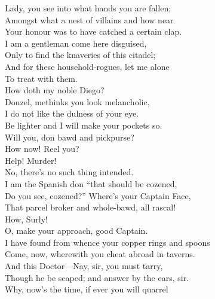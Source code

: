 \documentclass[a4paper,oneside,12pt]{memoir}
\begin{document}
\begin{drama*}
\surlyspeaks Lady, you see into what hands you are fallen;\\
Amongst what a nest of villains and how near\\
Your honour was to have catched a certain clap.\\
I am a gentleman come here disguised,\\
Only to find the knaveries of this citadel;\\
And for these household-rogues, let me alone\\
To treat with them.\\
\subtlespeaks {} How doth my noble Diego?\\
Donzel, methinks you look melancholic,\\
I do not like the dulness of your eye.\\
Be lighter and I will make your pockets so.\\
\surlyspeaks Will you, don bawd and pickpurse?\\
 How now! Reel you?\\
\subtlespeaks Help! Murder!\\
\surlyspeaks {} No, there's no such thing intended.\\
I am the Spanish don ``that should be cozened,\\
Do you see, cozened?'' Where's your Captain Face,\\
That parcel broker and whole-bawd, all rascal!\\
\facespeaks How, Surly!\\
\surlyspeaks {} O, make your approach, good Captain.\\
I have found from whence your copper rings and spoons\\
Come, now, wherewith you cheat abroad in taverns.\\
And this Doctor---Nay, sir, you must tarry,\\
Though he be scaped; and answer by the ears, sir.\\
\facespeaks Why, now's the time, if ever you will quarrel\\

\end{drama*}
\end{document}
